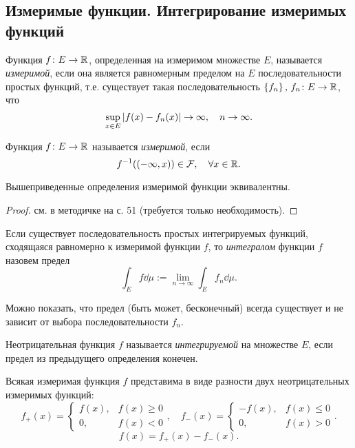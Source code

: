 \subsection[Интегрирование измеримых функций]{Измеримые функции. Интегрирование измеримых функций}
\begin{definition}
    Функция $f \colon E \to \mathbb{R}$, определенная на измеримом множестве $E$,
    называется \emph{измеримой}, если она является равномерным пределом на $E$
    последовательности простых функций, т.е. существует такая последовательность
    $\left\{f_n\right\},\, f_n \colon E \to \mathbb{R}$, что
    \[ \sup_{x\in E} \left|f(x) - f_n(x)\right| \to \infty, \quad n \to \infty. \]
\end{definition}

\begin{definition}
    Функция $f \colon E \to \mathbb{R}$ называется \emph{измеримой}, если
    \[ f^{-1}( (-\infty, x) ) \in \mathcal F, \quad \forall x \in \mathbb{R}. \]
\end{definition}

\begin{theorem}
    Вышеприведенные определения измеримой функции эквивалентны.
\end{theorem}

\begin{proof}
    см. в методичке на с. 51 (требуется только необходимость).
\end{proof}

\begin{definition}
    Если существует последовательность простых интегрируемых функций,
    сходящаяся равномерно к измеримой функции $f$, то \emph{интегралом} функции $f$
    назовем предел
    \[ \int_E f \dd \mu := \lim_{n\to \infty} \int_E f_n \dd \mu. \]
\end{definition}

Можно показать, что предел (быть может, бесконечный) всегда существует и не
зависит от выбора последовательности $f_n$.

\begin{definition}
    Неотрицательная функция $f$ называется \emph{интегрируемой} на множестве $E$, если предел из
    предыдущего определения конечен.
\end{definition}

Всякая измеримая функция $f$ представима в виде разности двух неотрицательных
измеримых функций:
\[ f_+(x) = 
    \begin{cases}
        f(x), & f(x) \geq 0 \\
        0, & f(x) < 0
    \end{cases}, \quad
   f_-(x) = 
    \begin{cases}
        -f(x), & f(x) \leq 0 \\
        0, & f(x) > 0
\end{cases}. \]
\[ f(x) = f_+(x) - f_-(x). \]

